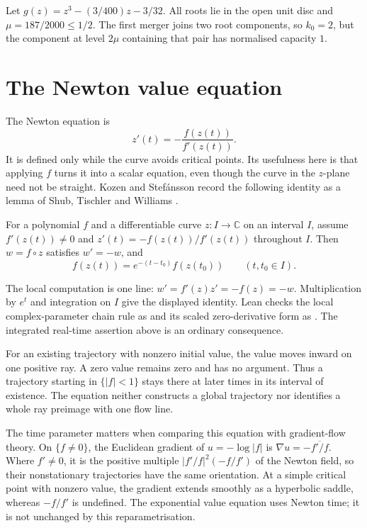\documentclass[11pt]{article}
\begin{document}
\begin{proposition}
\label{res:arity-not-capacity}
Let $g(z)=z^3-(3/400)z-3/32$. All roots lie in the open unit disc and
$\mu=187/2000\le1/2$. The first merger joins two root components, so
$k_0=2$, but the component at level $2\mu$ containing that pair has
normalised capacity $1$.
\end{proposition}

\section{The Newton value equation}\label{sec:newton}

The Newton equation is
\[
 z'(t)=-\frac{f(z(t))}{f'(z(t))}.
\]
It is defined only while the curve avoids critical points. Its usefulness
here is that applying $f$ turns it into a scalar equation, even though the
curve in the $z$-plane need not be straight. Kozen and Stef\'ansson record
the following identity as a lemma of Shub, Tischler and Williams
\cite[Lemma~2.1]{kozen-stefansson1997}.

\begin{theorem}\label{res:value}
For a polynomial $f$ and a differentiable curve $z:I\to\mathbb C$ on an
interval $I$, assume $f'(z(t))\ne0$ and
$z'(t)=-f(z(t))/f'(z(t))$ throughout $I$.  Then $w=f\circ z$ satisfies
$w'=-w$, and
\[
 f(z(t))=e^{-(t-t_0)}f(z(t_0))\qquad(t,t_0\in I).
\]
\end{theorem}

\noindent The local computation is one line:
$w'=f'(z)z'=-f(z)=-w$.  Multiplication by $e^t$ and integration on $I$
give the displayed identity.  Lean checks the local complex-parameter
chain rule as
and its scaled zero-derivative form as
.
The integrated real-time assertion above is an ordinary consequence.

For an existing trajectory with nonzero initial value, the value moves
inward on one positive ray.  A zero value remains zero and has no argument.
Thus a trajectory starting in $\{|f|<1\}$ stays there at later times in
its interval of existence. The equation neither constructs a global
trajectory nor identifies a whole ray preimage with one flow line.

The time parameter matters when comparing this equation with gradient-flow
theory. On $\{f\ne0\}$, the Euclidean gradient of $u=-\log|f|$ is
$\nabla u=-\overline{f'/f}$. Where $f'\ne0$, it is the positive multiple
$|f'/f|^2(-f/f')$ of the Newton field, so their nonstationary trajectories
have the same orientation. At a simple critical point with nonzero value,
the gradient extends smoothly as a hyperbolic saddle, whereas $-f/f'$ is
undefined. The exponential value equation uses Newton time; it is not
unchanged by this reparametrisation.
\end{document}
